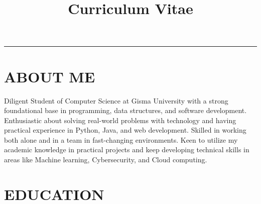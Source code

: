\documentclass[12pt,a4paper]{moderncv}
\title{Curriculum Vitae}
\begin{document}
\makecvtitle
\vspace{-2em}
\hrule
\vspace{1em}







\section{\textbf{ABOUT ME}}
    Diligent Student of Computer Science at Gisma University with a strong foundational base in programming, data structures, and software development. Enthusiastic about solving real-world problems with technology and having practical experience in Python, Java, and web development. Skilled in working both alone and in a team in fast-changing environments. Keen to utilize my academic knowledge in practical projects and keep developing technical skills in areas like Machine learning, Cybersecurity, and Cloud computing.

\vspace{0.5cm}







\section{\textbf{EDUCATION}}
\end{document}
